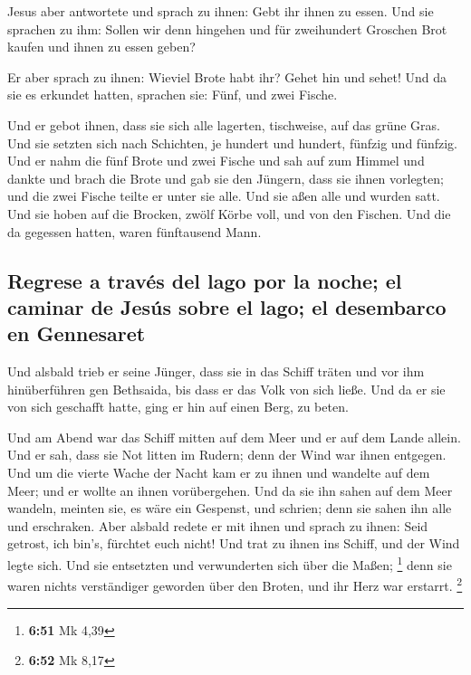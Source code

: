  Jesus aber antwortete und sprach zu ihnen: Gebt ihr
ihnen zu essen. Und sie sprachen zu ihm: Sollen wir denn hingehen und
für zweihundert Groschen Brot kaufen und ihnen zu essen geben?

 Er aber sprach zu ihnen: Wieviel Brote habt ihr? Gehet
hin und sehet! Und da sie es erkundet hatten, sprachen sie: Fünf, und
zwei Fische.

 Und er gebot ihnen, dass sie sich alle lagerten,
tischweise, auf das grüne Gras.  Und sie setzten sich
nach Schichten, je hundert und hundert, fünfzig und fünfzig.
 Und er nahm die fünf Brote und zwei Fische und sah auf
zum Himmel und dankte und brach die Brote und gab sie den Jüngern, dass
sie ihnen vorlegten; und die zwei Fische teilte er unter sie alle.
 Und sie aßen alle und wurden satt.  Und
sie hoben auf die Brocken, zwölf Körbe voll, und von den Fischen.
 Und die da gegessen hatten, waren fünftausend Mann.

\hypertarget{regrese-a-travuxe9s-del-lago-por-la-noche-el-caminar-de-jesuxfas-sobre-el-lago-el-desembarco-en-gennesaret}{%
\subsection{Regrese a través del lago por la noche; el caminar de Jesús
sobre el lago; el desembarco en
Gennesaret}\label{regrese-a-travuxe9s-del-lago-por-la-noche-el-caminar-de-jesuxfas-sobre-el-lago-el-desembarco-en-gennesaret}}

 Und alsbald trieb er seine Jünger, dass sie in das
Schiff träten und vor ihm hinüberführen gen Bethsaida, bis dass er das
Volk von sich ließe.  Und da er sie von sich geschafft
hatte, ging er hin auf einen Berg, zu beten.

 Und am Abend war das Schiff mitten auf dem Meer und er
auf dem Lande allein.  Und er sah, dass sie Not litten im
Rudern; denn der Wind war ihnen entgegen. Und um die vierte Wache der
Nacht kam er zu ihnen und wandelte auf dem Meer;  und er
wollte an ihnen vorübergehen. Und da sie ihn sahen auf dem Meer wandeln,
meinten sie, es wäre ein Gespenst, und schrien;  denn sie
sahen ihn alle und erschraken. Aber alsbald redete er mit ihnen und
sprach zu ihnen: Seid getrost, ich bin's, fürchtet euch nicht!
 Und trat zu ihnen ins Schiff, und der Wind legte sich.
Und sie entsetzten und verwunderten sich über die Maßen; \footnote{\textbf{6:51}
  Mk 4,39}  denn sie waren nichts verständiger geworden
über den Broten, und ihr Herz war erstarrt. \footnote{\textbf{6:52} Mk
  8,17}

